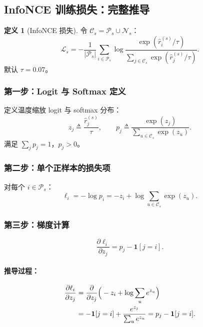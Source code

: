\documentclass[11pt,a4paper]{article}
\theoremstyle{definition}
\newtheorem{definition}{定义}[section]
\begin{document}
\subsection{InfoNCE 训练损失：完整推导}

\begin{definition}[InfoNCE 损失]
令 $\mathcal{C}_s = \mathcal{P}_s \cup \mathcal{N}_s$：
\begin{equation}\label{eq:infonce}
\mathcal{L}_s = -\frac{1}{|\mathcal{P}_s|} \sum_{i \in \mathcal{P}_s}
\log \frac{\exp(\hat{r}_i^{(s)}/\tau)}
     {\sum_{j \in \mathcal{C}_s} \exp(\hat{r}_j^{(s)}/\tau)}.
\end{equation}
默认 $\tau = 0.07$。
\end{definition}

\subsubsection{第一步：Logit 与 Softmax 定义}

定义温度缩放 logit 与 softmax 分布：
\begin{equation}
z_j \triangleq \frac{\hat{r}_j^{(s)}}{\tau}, \qquad
p_j \triangleq \frac{\exp(z_j)}{\sum_{u \in \mathcal{C}_s} \exp(z_u)}.
\end{equation}
满足 $\sum_j p_j = 1$，$p_j > 0$。

\subsubsection{第二步：单个正样本的损失项}

对每个 $i \in \mathcal{P}_s$：
\begin{equation}
\ell_i = -\log p_i = -z_i + \log \sum_{u \in \mathcal{C}_s} \exp(z_u).
\end{equation}

\subsubsection{第三步：梯度计算}

\begin{equation}\label{eq:grad}
\frac{\partial \ell_i}{\partial z_j} = p_j - \mathbf{1}[j = i].
\end{equation}

\paragraph{推导过程：}
\begin{align}
\frac{\partial \ell_i}{\partial z_j}
&= \frac{\partial}{\partial z_j}\Big(-z_i + \log \sum_u e^{z_u}\Big) \notag\\
&= -\mathbf{1}[j=i] + \frac{e^{z_j}}{\sum_u e^{z_u}} = p_j - \mathbf{1}[j=i].
\end{align}
\end{document}
